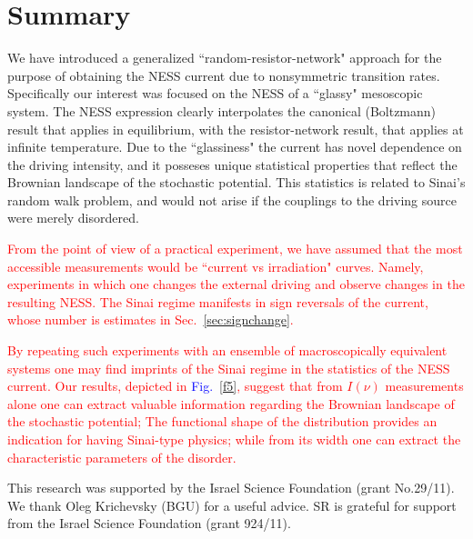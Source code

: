 \documentclass[aps,pre,floats,floatfix,twocolumn]{revtex4}
\newcommand{\Fig}[1]{\textcolor{blue}{Fig.}\!\!~\ref{#1}}
\newcommand{\rmrk}[1]{\textcolor{red}{#1}}
\begin{document}
\section{Summary}
\label{sec:summary}

We have introduced a generalized ``random-resistor-network"
approach for the purpose of obtaining the NESS current
due to nonsymmetric transition rates. Specifically our 
interest was focused on the NESS of a ``glassy" mesoscopic system. 
The NESS expression clearly interpolates the canonical (Boltzmann) result 
that applies in equilibrium, with the resistor-network result, 
that applies at infinite temperature. 
Due to the ``glassiness" the current has novel dependence 
on the driving intensity, and it posseses unique statistical properties 
that reflect the Brownian landscape of the stochastic potential.
This statistics is related to Sinai's random walk problem, 
and would not arise if the couplings to the driving source 
were merely disordered.

\rmrk{From the point of view of a practical experiment, 
we have assumed that the most accessible measurements 
would be ``current vs irradiation" curves. Namely,
experiments in which one changes the external driving and observe changes
in the resulting NESS. The Sinai regime manifests in sign reversals
of the current, whose number is estimates in Sec.~\ref{sec:signchange}.}

\rmrk{By repeating such experiments with an ensemble
of macroscopically equivalent systems one may find imprints of 
the Sinai regime in the statistics of the NESS current.
Our results, depicted in \Fig{f5}, suggest that from $I(\nu)$ measurements alone 
one can extract valuable information regarding 
the Brownian landscape of the stochastic potential;
The functional shape of the distribution provides 
an indication for having Sinai-type physics; 
while from its width one can extract the characteristic 
parameters of the disorder.}       


\begin{acknowledgements}
%
This research was supported by the Israel Science Foundation (grant No.29/11).
We thank Oleg Krichevsky (BGU) for a useful advice. SR is grateful for support from
the Israel Science Foundation (grant 924/11).
%
\end{acknowledgements}
\end{document}

